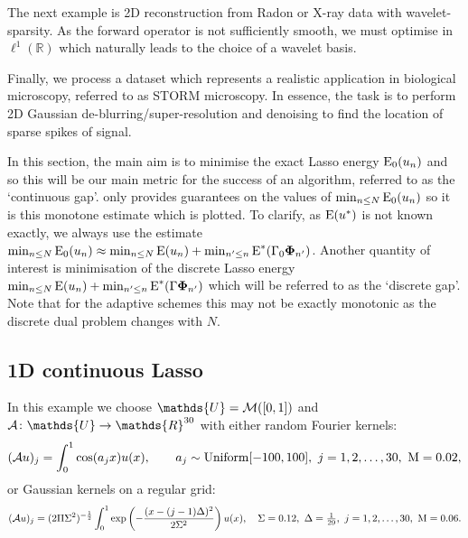 \documentclass[10pt,a4paper,onecolumn]{article}
\numberwithin{equation}{section}
\let\F\mathds\let\C\mathcal\newcommand{\R}{\F{R}}\newcommand{\A}{\C{A}}
\newcommand{\op}[1]{\operatorname{#1}}\newcommand{\overtext}[2]{\stackrel{\text{#1}}{#2}}
\renewcommand{\vec}{\mathbf}
\newcommand*{\Func}[1]{%
	\IfEqCase{#1}{%
		{0}{\op{E}}%
		{1}{\op{F}}%
		{2}{\op{G}}%
		{3}{\op{H}}%
	}[\op{F}#1]%
}
\newcommand*{\varf}[1]{%
	\IfEqCase{#1}{%
		{0}{u}%
		{1}{v}%
		{2}{w}%
	}[u#1]%
}
\newcommand*{\spcf}[1]{%
	\IfEqCase{#1}{%
		{0}{\F{U}}%
		{1}{\F{V}}%
		{2}{\F{W}}%
	}[\F{U}#1]%
}
\newcommand*{\vard}[1]{%
	\IfEqCase{#1}{%
		{0}{\varphi}%
		{1}{\psi}%
	}[\varphi #1]%
}
\newcommand*{\varx}[1]{%
	\IfEqCase{#1}{%
		{0}{x}%
		{1}{y}%
		{2}{z}%
		{3}{r}%
	}[x#1]%
}
\newcommand*{\vars}[1]{%
	\IfEqCase{#1}{%
		{0}{\alpha}%
		{1}{\beta}%
		{2}{\gamma}%
		{3}{a}%
		{4}{b}%
		{5}{c}%
	}[k#1]%
}
\newcommand*{\data}[1]{%
	\IfEqCase{#1}{%
		{0}{\eta}%
		{1}{\nu}%
	}[g]%
}
\newcommand*{\vvard}[1]{\vec{\vard{#1}}}\newcommand*{\vdata}[1]{\vec{\data{#1}}}
\begin{document}
The next example is 2D reconstruction from Radon or X-ray data with wavelet-sparsity. As the forward operator is not sufficiently smooth, we must optimise in $\ell^1(\R)$ which naturally leads to the choice of a wavelet basis. 

Finally, we process a dataset which represents a realistic application in biological microscopy, referred to as STORM microscopy. In essence, the task is to perform 2D Gaussian de-blurring/super-resolution and denoising to find the location of sparse spikes of signal.

In this section, the main aim is to minimise the exact Lasso energy $\Func0_0(\varf0_n)$ and so this will be our main metric for the success of an algorithm, referred to as the `continuous gap'.  only provides guarantees on the values of $\min_{n\leq N}\Func0_0(\varf0_n)$ so it is this monotone estimate which is plotted. To clarify, as $\Func0(\varf0^*)$ is not known exactly, we always use the estimate $\min_{n\leq N}\Func0_0(\varf0_n) \approx \min_{n\leq N}\Func0(\varf0_n) + \min_{n'\leq n}\Func0^*(\vars2_0\vvard0_{n'})$. Another quantity of interest is minimisation of the discrete Lasso energy $\min_{n\leq N}\Func0(\varf0_n) + \min_{n'\leq n}\Func0^*(\vars2\vvard0_{n'})$ which will be referred to as the `discrete gap'. Note that for the adaptive schemes this may not be exactly monotonic as the discrete dual problem changes with $N$.


\subsection{1D continuous Lasso}\label{sec: 1D Lasso examples}
In this example we choose $\spcf0=\C M([0,1])$ and $\A\colon \spcf0\to \R^{30}$ with either random Fourier kernels:
\begin{equation}
	(\A\varf0)_j = \int_0^1\cos(\vars3_j\varx0)\varf0(\varx0), \qquad \vars3_j\sim \op{Uniform}[-100,100],\ j=1,2,\ldots,30,\ \mu =0.02, 
\end{equation}
or Gaussian kernels on a regular grid:
\begin{equation}
	(\A\varf0)_j = (2\pi\sigma^2)^{-\frac12}\int_0^1\exp\left(-\frac{(\varx0-(j-1)\Delta)^2}{2\sigma^2}\right)\varf0(\varx0), \quad \sigma=0.12,\ \Delta = \tfrac1{29},\ j=1,2,\ldots,30,\ \mu=0.06.
\end{equation}
\end{document}
